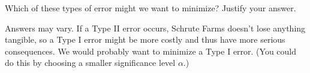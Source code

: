 \documentclass[noanswers]{exam}
\begin{document}
\begin{questions}
\question Which of these types of error might we want to minimize? Justify your answer. 

\begin{solution}[\stretch{1}]

\vspace{1mm}

Answers may vary. If a Type II error occurs, Schrute Farms doesn't lose anything tangible, so a Type I error might be more costly and thus have more serious consequences. We would probably want to minimize a Type I error. (You could do this by choosing a smaller significance level $\alpha$.)

\vspace{1mm}

\end{solution}


\end{questions}

\end{document}
